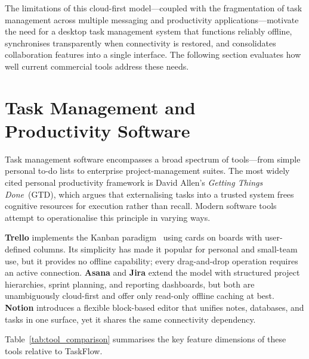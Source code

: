 The limitations of this cloud-first model---coupled with the fragmentation of
task management across multiple messaging and productivity applications---motivate
the need for a desktop task management system that functions reliably offline,
synchronises transparently when connectivity is restored, and consolidates
collaboration features into a single interface.
The following section evaluates how well current commercial tools address these needs.

\section{Task Management and Productivity Software}\label{sec:bg_tasktools}

Task management software encompasses a broad spectrum of tools---from simple personal
to-do lists to enterprise project-management suites.
The most widely cited personal productivity framework is David Allen's
\emph{Getting Things Done}~(GTD), which argues that externalising
tasks into a trusted system frees cognitive resources for execution rather than recall.
Modern software tools attempt to operationalise this principle in varying ways.

\textbf{Trello} implements the Kanban paradigm~\cite{anderson2010kanban} using cards
on boards with user-defined columns.
Its simplicity has made it popular for personal and small-team use, but it provides
no offline capability; every drag-and-drop operation requires an active connection.
\textbf{Asana} and \textbf{Jira} extend the model with structured project hierarchies,
sprint planning, and reporting dashboards, but both are unambiguously cloud-first and
offer only read-only offline caching at best.
\textbf{Notion} introduces a flexible block-based editor that unifies notes, databases,
and tasks in one surface, yet it shares the same connectivity dependency.

Table~\ref{tab:tool_comparison} summarises the key feature dimensions of these
tools relative to TaskFlow.

